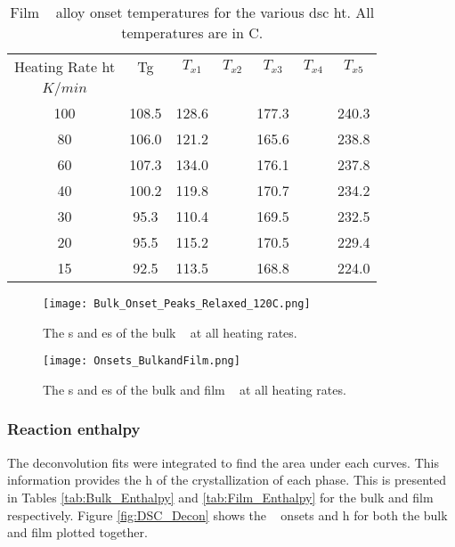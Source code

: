 \documentclass[a4paper,12pt,oneside]{article}%
\begin{document}
\begin{table}[h]
	\centering
	\begin{tabular}{ c c c c c c c }
		\toprule
		Heating Rate \acrshort{ht} & \acrshort{Tg} & $T_{x1}$ & $T_{x2}$ & $T_{x3}$ & $T_{x4}$ & $T_{x5}$ \\ 
		$K/min$ & & & & & & \\
		\midrule
		100 & 108.5 & 128.6 &  & 177.3 &  & 240.3 \\
		80  & 106.0 & 121.2 &  & 165.6 &  & 238.8 \\
		60  & 107.3 & 134.0 &  & 176.1 &  & 237.8 \\
		40  & 100.2 & 119.8 &  & 170.7 &  & 234.2 \\
		30  & 95.3  & 110.4 &  & 169.5 &  & 232.5 \\
		20  & 95.5  & 115.2 &  & 170.5 &  & 229.4 \\
		15  & 92.5  & 113.5 &  & 168.8 &  & 224.0 \\
		\bottomrule
	\end{tabular}
	\caption{Film \MgZnCa~ alloy onset temperatures for the various \acrshort{dsc}  \acrshort{ht}. All temperatures are in \degree C.}
	\label{tab:FilmOnsets}
\end{table}

\begin{figure}[b]
	\centering
	\texttt{[image: Bulk\_Onset\_Peaks\_Relaxed\_120C.png]}
	\caption[Table of contents Capition]{The \Tg s and \Tx es of the bulk \MgZnCa~ at all heating rates. }%
	\label{fig:DSC_Onsets_Bulk}
\end{figure}

\begin{figure}[b]
	\centering
	\texttt{[image: Onsets\_BulkandFilm.png]}
	\caption[Table of contents Capition]{The \Tg s and \Tx es of the bulk and film \MgZnCa~ at all heating rates. }%
	\label{fig:DSC_Onsets_BulkFilm}
\end{figure}

\subsubsection{Reaction enthalpy}

The deconvolution fits were integrated to find the area under each curves. This information provides the \gls{h} of the crystallization of each phase. This is presented in Tables \ref{tab:Bulk_Enthalpy} and \ref{tab:Film_Enthalpy} for the bulk and film respectively. Figure \ref{fig:DSC_Decon} shows the \Tx~ onsets and \acrfull{h} for both the bulk and film plotted together.
\end{document}
